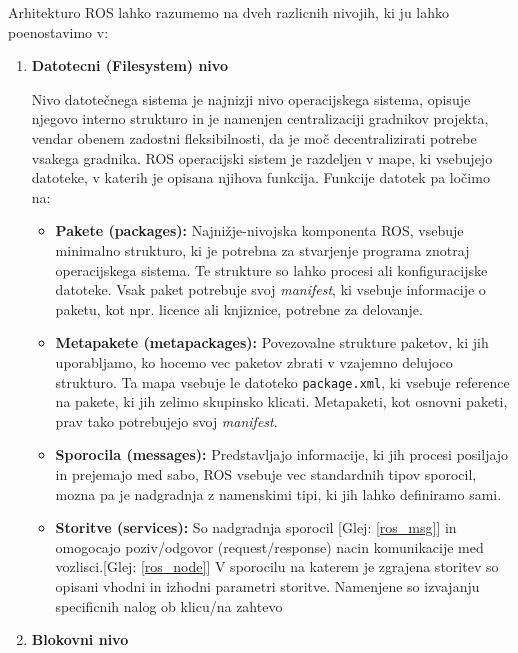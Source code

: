 \documentclass[a4paper,twoside,openright,12pt,slovene]{book}
\begin{document}
Arhitekturo ROS lahko razumemo na dveh razlicnih nivojih, ki ju lahko poenostavimo v:
\begin{enumerate}
    \item  \label{file_lvl} \textbf{Datotecni (Filesystem) nivo} 
    
    Nivo datotečnega sistema je najnizji nivo operacijskega sistema, opisuje njegovo interno strukturo in je namenjen centralizaciji gradnikov projekta, vendar obenem zadostni fleksibilnosti, da je moč decentralizirati potrebe vsakega gradnika. ROS operacijski sistem je razdeljen v mape, ki vsebujejo datoteke, v katerih je opisana njihova funkcija. Funkcije datotek pa ločimo na:
        \begin{itemize}
            \item \textbf{Pakete (packages):} Najnižje-nivojska komponenta ROS, vsebuje minimalno strukturo, ki je potrebna za stvarjenje programa znotraj operacijskega sistema. Te strukture so lahko procesi ali konfiguracijske datoteke. Vsak paket potrebuje svoj \textit{manifest}, ki vsebuje informacije o paketu, kot npr. licence ali knjiznice, potrebne za delovanje.

            \item \textbf{Metapakete (metapackages):} Povezovalne strukture paketov, ki jih uporabljamo, ko hocemo vec paketov zbrati v vzajemno delujoco strukturo. Ta mapa vsebuje le datoteko \verb|package.xml|, ki vsebuje reference na pakete, ki jih zelimo skupinsko klicati. Metapaketi, kot osnovni paketi, prav tako potrebujejo svoj \textit{manifest}.

            \item \label{ros_msg} \textbf{Sporocila (messages):} Predstavljajo informacije, ki jih procesi posiljajo in prejemajo med sabo, ROS vsebuje vec standardnih tipov sporocil, mozna pa je nadgradnja z namenskimi tipi, ki jih lahko definiramo sami.

            \item \textbf{Storitve (services):} So nadgradnja sporocil [Glej: \ref{ros_msg}] in omogocajo poziv/odgovor (request/response) nacin komunikacije med vozlisci.[Glej: \ref{ros_node}] V sporocilu na katerem je zgrajena storitev so opisani vhodni in izhodni parametri storitve. Namenjene so izvajanju specificnih nalog ob klicu/na zahtevo
        \end{itemize}

 \item \label{block_lvl} \textbf{Blokovni nivo} 
 

\end{enumerate}
\end{document}

